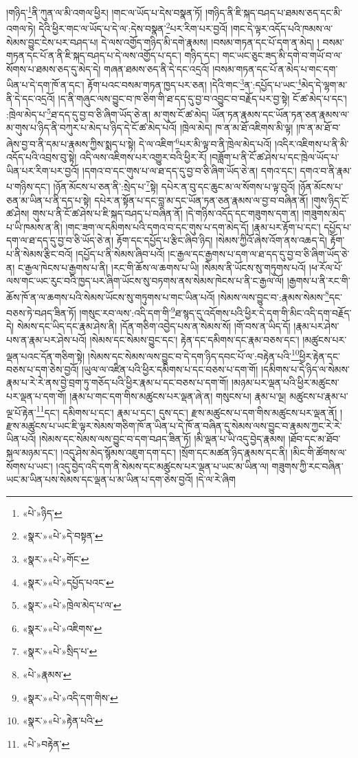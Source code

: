 །གཉིད་\footnote{«པེ་»ཉིད་}ནི་ཀུན་ལ་མི་འགལ་ཕྱིར། །གང་ལ་ཡོད་པ་དེས་བསྣན་ཏོ། །གཉིད་ནི་ཇི་སྐད་བཤད་པ་ཐམས་ཅད་དང་མི་འགལ་ཏེ། དེའི་ཕྱིར་གང་ལ་ཡོད་པ་དེ་ལ་:དེས་བསྣན་\footnote{«སྣར་»«པེ་»དེ་བསྟན་}པར་རིག་པར་བྱའོ། །གང་དེ་ལྟར་འདོད་པའི་ཁམས་ལ་སེམས་བྱུང་ངེས་པར་བཤད་པ། དེ་ལས་འགྱོད་གཉིད་མི་དགེ་རྣམས། །བསམ་གཏན་དང་པོ་དག་ན་མེད། །
བསམ་གཏན་དང་པོ་ན་ནི་ཇི་སྐད་བཤད་པ་དེ་ལས་འགྱོད་པ་དང་། གཉིད་དང་། གང་ཡང་ཅུང་ཟད་མི་དགེ་བ་གཡོ་བ་ལ་སོགས་པ་ཐམས་ཅད་དུ་མེད་དེ། གཞན་ཐམས་ཅད་ནི་དེ་དང་འདྲའོ། །བསམ་གཏན་དང་པོ་ན་མེད་པ་གང་དག་ཡིན་པ་དེ་དག་ཁོ་ན་དང་། རྟོག་པའང་བསམ་གཏན་ཁྱད་པར་ཅན། །དེའི་གང་\footnote{«སྣར་»«པེ་»གོང་}ན་:དཔྱོད་པ་ཡང་\footnote{«སྣར་»«པེ་»དཔྱོད་པའང་}མེད་དེ་ལྷག་མ་ནི་དེ་དང་འདྲའོ། །ད་ནི་གཞུང་ལས་བྱུང་བ་ཁ་ཅིག་གི་ཐ་དད་དུ་བྱ་བ་འབྱུང་བ་བརྗོད་པར་བྱ་སྟེ། ངོ་ཚ་མེད་པ་དང་། :ཁྲེལ་མེད་པ་\footnote{«སྣར་»«པེ་»ཁྲེལ་མེད་པ་ལ་}ཐ་དད་དུ་བྱ་བ་ཅི་ཞིག་ཡོད་ཅེ་ན། མ་གུས་ངོ་ཚ་མེད། ཡོན་ཏན་རྣམས་དང་ཡོན་ཏན་ཅན་རྣམས་ལ་མ་གུས་པ་ཉིད་ནི་བཀུར་པ་མེད་པ་ཉིད་དེ་ངོ་ཚ་མེད་པའོ། །ཁྲེལ་མེད། ཁ་ན་མ་ཐོ་འཇིགས་མི་ལྟ། །ཁ་ན་མ་ཐོ་བ་ཞེས་བྱ་བ་ནི་དམ་པ་རྣམས་ཀྱིས་སྨད་པ་སྟེ། དེ་ལ་འཇིག་\footnote{«སྣར་»«པེ་»འཇིགས་}པར་མི་ལྟ་བ་ནི་ཁྲེལ་མེད་པའོ། །འདིར་འཇིགས་པ་ནི་མི་འདོད་པའི་འབྲས་བུ་སྟེ། འདི་ལས་འཇིགས་པར་འགྱུར་བའི་ཕྱིར་རོ། །བཟློག་པ་ནི་ངོ་ཚ་ཤེས་པ་དང་ཁྲེལ་ཡོད་པ་ཡིན་པར་རིག་པར་བྱའོ། །དགའ་བ་དང་གུས་པ་ལ་ཐ་དད་དུ་བྱ་བ་ཅི་ཞིག་ཡོད་ཅེ་ན། དགའ་དང་། དགའ་བ་ནི་རྣམ་པ་གཉིས་དང་། །ཉོན་མོངས་པ་ཅན་ནི་:སྲེད་པ་\footnote{«སྣར་»«པེ་»སྲིད་པ་}སྟེ། དཔེར་ན་བུ་དང་ཆུང་མ་ལ་སོགས་པ་ལྟ་བུའོ། །ཉོན་མོངས་པ་ཅན་མ་ཡིན་པ་ནི་དད་པ་སྟེ། དཔེར་ན་སྟོན་པ་དང་བླ་མ་དང་ཡོན་ཏན་ཅན་རྣམས་ལ་བྱ་བ་བཞིན་ནོ། །གུས་ཉིད་ངོ་ཚ་ཤེས། གུས་པ་ནི་ངོ་ཚ་ཤེས་པ་ཇི་སྐད་བཤད་པ་བཞིན་ནོ། །དེ་གཉིས་འདོད་དང་གཟུགས་དག་ན། །གཟུགས་མེད་པ་ཡི་ཁམས་ན་ནི། །གང་ཟག་ལ་དམིགས་པའི་དགའ་བ་དང་གུས་པ་དག་མེད་དོ། །རྣམ་པར་རྟོག་པ་དང་། དཔྱོད་པ་དག་ལ་ཐ་དད་དུ་བྱ་བ་ཅི་ཡོད་ཅེ་ན། རྟོག་དང་དཔྱོད་པ་རྩིང་ཞིབ་ཉིད། །སེམས་ཀྱིའོ་ཞེས་འོག་ནས་འཆད་དེ། རྟོག་པ་ནི་སེམས་རྩིང་བའོ། །དཔྱོད་པ་ནི་སེམས་ཞིབ་པའོ། །ང་རྒྱལ་དང་རྒྱགས་པ་དག་ལ་ཐ་དད་དུ་བྱ་བ་ཅི་ཞིག་ཡོད་ཅེ་ན། ང་རྒྱལ་ཁེངས་པ་རྒྱགས་པ་ནི། །རང་གི་ཆོས་ལ་ཆགས་པ་ཡི། །སེམས་ནི་ཡོངས་སུ་གཏུགས་པའོ། །ཕ་རོལ་པོ་ལས་གང་ཡང་རུང་བའི་ཁྱད་པར་ཞིག་ཡོངས་སུ་བཏགས་ནས་སེམས་ཁེངས་པ་ནི་ང་རྒྱལ་ལོ། །རྒྱགས་པ་ནི་རང་གི་ཆོས་ཁོ་ན་ལ་ཆགས་པའི་སེམས་ཡོངས་སུ་གཏུགས་པ་གང་ཡིན་པའོ། །སེམས་ལས་བྱུང་བ་:རྣམས་སེམས་\footnote{«པེ་»རྣམས་}དང་བཅས་ཏེ་བཤད་ཟིན་ཏོ། །གསུང་རབ་ལས་:འདི་དག་གི་\footnote{«སྣར་»«པེ་»འདི་དག་གིས་}ཐ་སྙད་དུ་འདོགས་པའི་ཕྱིར་དེ་དག་གི་མིང་འདི་དག་བརྗོད་དེ། སེམས་དང་ཡིད་དང་རྣམ་ཤེས་ནི། །དོན་གཅིག་འབྱེད་པས་ན་སེམས་སོ། །གོ་བས་ན་ཡིད་དོ། །རྣམ་པར་ཤེས་པས་ན་རྣམ་པར་ཤེས་པའོ། །སེམས་དང་སེམས་བྱུང་དང་། རྟེན་དང་དམིགས་དང་རྣམ་བཅས་དང་། །མཚུངས་པར་ལྡན་པའང་དོན་གཅིག་སྟེ། །སེམས་དང་སེམས་ལས་བྱུང་བ་དེ་དག་ཉིད་དབང་པོ་ལ་:བརྟེན་པའི་\footnote{«སྣར་»«པེ་»རྟེན་པའི་}ཕྱིར་རྟེན་དང་བཅས་པ་དག་ཅེས་བྱའོ། །ཡུལ་ལ་འཛིན་པའི་ཕྱིར་དམིགས་པ་དང་བཅས་པ་དག་གོ། །དམིགས་པ་དེ་ཉིད་ལ་སེམས་རྣམ་པ་རེ་རེ་ནས་བྱེ་བྲག་ཏུ་གཅོད་པའི་ཕྱིར་རྣམ་པ་དང་བཅས་པ་དག་གོ། །མཉམ་པར་ལྡན་པའི་ཕྱིར་མཚུངས་པར་ལྡན་པ་དག་གོ། །རྣམ་པ་གང་དག་གིས་མཚུངས་པར་ལྡན་ཞེ་ན། གསུངས་པ། རྣམ་པ་ལྔ། མཚུངས་པ་རྣམ་པ་ལྔ་པོ་རྟེན་\footnote{«པེ་»བརྟེན་}དང་། དམིགས་པ་དང་། རྣམ་པ་དང་། དུས་དང་། རྫས་མཚུངས་པ་དག་གིས་མཚུངས་པར་ལྡན་ནོ། །རྫས་མཚུངས་པ་ཡང་ཇི་ལྟར་སེམས་གཅིག་ཁོ་ན་ཡིན་པ་དེ་ཁོ་ན་བཞིན་དུ་སེམས་ལས་བྱུང་བ་རྣམས་ཀྱང་རེ་རེ་ཡིན་པའོ། །སེམས་དང་སེམས་ལས་བྱུང་བ་དག་བཤད་ཟིན་ཏོ། །མི་ལྡན་པ་ཡི་འདུ་བྱེད་རྣམས། །ཐོབ་དང་མ་ཐོབ་སྐལ་མཉམ་དང་། །འདུ་ཤེས་མེད་སྙོམས་འཇུག་དག་དང་། །སྲོག་དང་མཚན་ཉིད་རྣམས་དང་ནི། །མིང་གི་ཚོགས་ལ་སོགས་པ་ཡང་། །འདུ་བྱེད་འདི་དག་ནི་སེམས་དང་མཚུངས་པར་ལྡན་པ་ཡང་མ་ཡིན་ལ། གཟུགས་ཀྱི་རང་བཞིན་ཡང་མ་ཡིན་པས་སེམས་དང་ལྡན་པ་མ་ཡིན་པ་དག་ཅེས་བྱའོ། །དེ་ལ་རེ་ཞིག 